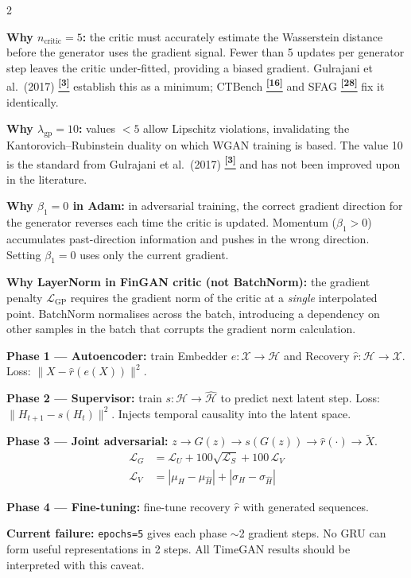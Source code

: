 \documentclass[10pt]{article}
\newcommand{\navybox}[2]{\begin{tcolorbox}[mybox={Navy}{LBg},title={#1}]#2\end{tcolorbox}}
\newcommand{\tealbox}[2]{\begin{tcolorbox}[mybox={Teal}{LBg},title={#1}]#2\end{tcolorbox}}
\newcommand{\tcite}[1]{%
  \hyperlink{R:#1}{\textsuperscript{\scriptsize\textbf{[#1]}}}}
\begin{document}
\vspace{6pt}
\begin{multicols}{2}
\small

\navybox{WGAN-GP shared settings (QuantGAN \& FinGAN)}{%
\textbf{Why $n_\text{critic}=5$:} the critic must accurately estimate the Wasserstein distance before the generator uses the gradient signal. Fewer than 5 updates per generator step leaves the critic under-fitted, providing a biased gradient. Gulrajani et al.\ (2017)\tcite{3} establish this as a minimum; CTBench\tcite{16} and SFAG\tcite{28} fix it identically.

\textbf{Why $\lambda_\text{gp}=10$:} values $<5$ allow Lipschitz violations, invalidating the Kantorovich--Rubinstein duality on which WGAN training is based. The value 10 is the standard from Gulrajani et al.\ (2017)\tcite{3} and has not been improved upon in the literature.

\textbf{Why $\beta_1=0$ in Adam:} in adversarial training, the correct gradient direction for the generator reverses each time the critic is updated. Momentum ($\beta_1>0$) accumulates past-direction information and pushes in the wrong direction. Setting $\beta_1=0$ uses only the current gradient.

\textbf{Why LayerNorm in FinGAN critic (not BatchNorm):} the gradient penalty $\mathcal{L}_\text{GP}$ requires the gradient norm of the critic at a \emph{single} interpolated point. BatchNorm normalises across the batch, introducing a dependency on other samples in the batch that corrupts the gradient norm calculation.}

\columnbreak

\tealbox{TimeGAN four-phase training}{%
\textbf{Phase 1 --- Autoencoder:} train Embedder $e: \mathcal{X} \to \mathcal{H}$ and Recovery $\hat{r}: \mathcal{H} \to \mathcal{X}$. Loss: $\|X - \hat{r}(e(X))\|^2$.

\textbf{Phase 2 --- Supervisor:} train $s: \mathcal{H} \to \hat{\mathcal{H}}$ to predict next latent step. Loss: $\|H_{t+1} - s(H_t)\|^2$. Injects temporal causality into the latent space.

\textbf{Phase 3 --- Joint adversarial:} $z \to G(z) \to s(G(z)) \to \hat{r}(\cdot) \to \tilde{X}$.
\begin{align*}
  \mathcal{L}_G &= \mathcal{L}_U + 100\sqrt{\mathcal{L}_S} + 100\,\mathcal{L}_V \\
  \mathcal{L}_V &= |\mu_H - \mu_{\hat{H}}| + |\sigma_H - \sigma_{\hat{H}}|
\end{align*}

\textbf{Phase 4 --- Fine-tuning:} fine-tune recovery $\hat{r}$ with generated sequences.

\textbf{Current failure:} \texttt{epochs=5} gives each phase $\sim$2 gradient steps. No GRU can form useful representations in 2 steps. All TimeGAN results should be interpreted with this caveat.}

\end{multicols}
\end{document}
